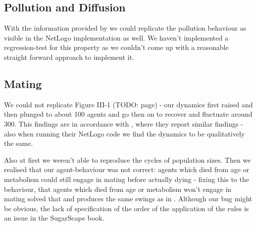 \subsection{Pollution and Diffusion}
With the information provided by \cite{weaver_replicating_2009} we could replicate the pollution behaviour as visible in the NetLogo implementation as well. We haven't implemented a regression-test for this property as we couldn't come up with a reasonable straight forward approach to implement it.



\subsection{Mating}
We could not replicate Figure III-1 (TODO: page) - our dynamics first raised and then plunged to about 100 agents and go then on to recover and fluctuate around 300. This findings are in accordance with \cite{weaver_replicating_2009}, where they report similar findings - also when running their NetLogo code we find the dynamics to be qualitatively the same.

Also at first we weren't able to reproduce the cycles of population sizes. Then we realised that our agent-behaviour was not correct: agents which died from age or metabolism could still engage in mating before actually dying - fixing this to the behaviour, that agents which died from age or metabolism won't engage in mating solved that and produces the same swings as in \cite{weaver_replicating_2009}. Although our bug might be obvious, the lack of specification of the order of the application of the rules is an issue in the SugarScape book.

